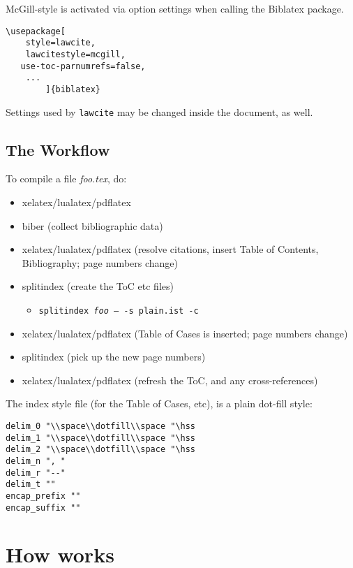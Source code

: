 McGill-style is activated via option settings when calling the Biblatex package.

\begin{verbatim}
\usepackage[
	style=lawcite, 
	lawcitestyle=mcgill,
   use-toc-parnumrefs=false,
	...
		]{biblatex}
\end{verbatim}

Settings used by \texttt{lawcite} may be changed inside the document, as well.

\subsection{The Workflow}
To compile a file \textit{foo.tex}, do:
\begin{itemize}
\item xelatex/lualatex/pdflatex
\item biber (collect bibliographic data)
\item xelatex/lualatex/pdflatex (resolve citations, insert Table of Contents, Bibliography; page numbers change)
\item splitindex (create the ToC etc files)
\begin{itemize}
\item[] \texttt{splitindex \textit{foo} -- -s plain.ist -c}
\end{itemize}
\item xelatex/lualatex/pdflatex (Table of Cases is inserted; page numbers change)
\item splitindex (pick up the new page numbers)
\item xelatex/lualatex/pdflatex (refresh the ToC, and any cross-references)
\end{itemize}
The index style file (for the Table of Cases, etc), is a plain dot-fill style:
\begin{verbatim}
delim_0 "\\space\\dotfill\\space "\hss
delim_1 "\\space\\dotfill\\space "\hss
delim_2 "\\space\\dotfill\\space "\hss
delim_n ", "
delim_r "--"
delim_t ""
encap_prefix ""
encap_suffix ""
\end{verbatim}

\section{How  works}
